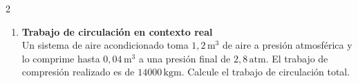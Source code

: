 \documentclass[a4paper,12pt]{article}
\begin{document}
\begin{multicols}{2}
\begin{enumerate}
\vspace{0.3cm}

\item \textbf{Trabajo de circulación en contexto real} \\
Un sistema de aire acondicionado toma $1{,}2\,\text{m}^3$ de aire a presión atmosférica y lo comprime hasta $0{,}04\,\text{m}^3$ a una presión final de $2{,}8\,\text{atm}$. El trabajo de compresión realizado es de $14000\,\text{kgm}$. Calcule el trabajo de circulación total.

\end{enumerate}

\end{multicols}
\end{document}

